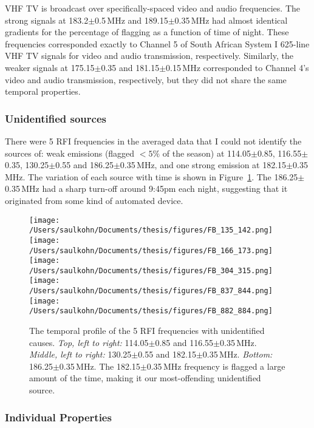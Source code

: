 VHF TV is broadcast over specifically-spaced video and audio frequencies. The strong signals at 183.2$\pm$0.5\,MHz and 189.15$\pm$0.35\,MHz had almost identical gradients for the percentage of flagging as a function of time of night. These frequencies corresponded exactly to Channel 5 of South African System I 625-line VHF TV signals for video and audio transmission, respectively. Similarly, the weaker signals at 175.15$\pm$0.35	 and 181.15$\pm$0.15\,MHz corresponded to Channel 4's video and audio transmission, respectively, but they did not share the same temporal properties.

\subsubsection*{Unidentified sources}

There were 5 RFI frequencies in the averaged data that I could not identify the sources of:  weak emissions (flagged $<5\%$ of the season) at 114.05$\pm$0.85, 116.55$\pm$0.35, 130.25$\pm$0.55 and 186.25$\pm$0.35\,MHz, and one strong emission at 182.15$\pm$0.35\,MHz. The variation of each source with time is shown in Figure~\ref{fig:rfi_psa128_unidentified}. The 186.25$\pm$0.35\,MHz had a sharp turn-off around 9:45pm each night, suggesting that it originated from some kind of automated device.\\

\begin{figure}
\centering
\texttt{[image: /Users/saulkohn/Documents/thesis/figures/FB\_135\_142.png]}
\texttt{[image: /Users/saulkohn/Documents/thesis/figures/FB\_166\_173.png]}
\texttt{[image: /Users/saulkohn/Documents/thesis/figures/FB\_304\_315.png]}
\texttt{[image: /Users/saulkohn/Documents/thesis/figures/FB\_837\_844.png]}
\texttt{[image: /Users/saulkohn/Documents/thesis/figures/FB\_882\_884.png]}
\caption[The temporal profile of the 5 RFI frequencies with unidentified causes.]{The temporal profile of the 5 RFI frequencies with unidentified causes. \textit{Top, left to right:} 114.05$\pm$0.85 and 116.55$\pm$0.35\,MHz. \textit{Middle, left to right:} 130.25$\pm$0.55 and 182.15$\pm$0.35\,MHz. \textit{Bottom:} 186.25$\pm$0.35\,MHz. The 182.15$\pm$0.35\,MHz frequency is flagged a large amount of the time, making it our most-offending unidentified source.}
\label{fig:rfi_psa128_unidentified}
\end{figure}

\subsubsection{Individual Properties}
\label{subsubsec:indivprops}

